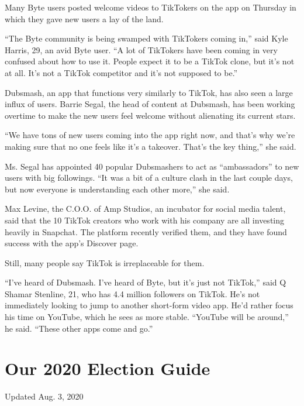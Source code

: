 Many Byte users posted welcome videos to TikTokers on the app on
Thursday in which they gave new users a lay of the land.

``The Byte community is being swamped with TikTokers coming in,'' said
Kyle Harris, 29, an avid Byte user. ``A lot of TikTokers have been
coming in very confused about how to use it. People expect it to be a
TikTok clone, but it's not at all. It's not a TikTok competitor and it's
not supposed to be.''

Dubsmash, an app that functions very similarly to TikTok, has also seen
a large influx of users. Barrie Segal, the head of content at Dubsmash,
has been working overtime to make the new users feel welcome without
alienating its current stars.

``We have tons of new users coming into the app right now, and that's
why we're making sure that no one feels like it's a takeover. That's the
key thing,'' she said.

Ms. Segal has appointed 40 popular Dubsmashers to act as ``ambassadors''
to new users with big followings. ``It was a bit of a culture clash in
the last couple days, but now everyone is understanding each other
more,'' she said.

Max Levine, the C.O.O. of Amp Studios, an incubator for social media
talent, said that the 10 TikTok creators who work with his company are
all investing heavily in Snapchat. The platform recently verified them,
and they have found success with the app's Discover page.

Still, many people say TikTok is irreplaceable for them.

``I've heard of Dubsmash. I've heard of Byte, but it's just not
TikTok,'' said Q Shamar Stenline, 21, who has 4.4 million followers on
TikTok. He's not immediately looking to jump to another short-form video
app. He'd rather focus his time on YouTube, which he sees as more
stable. ``YouTube will be around,'' he said. ``These other apps come and
go.''

\hypertarget{our-2020-election-guide}{%
\section{Our 2020 Election Guide}\label{our-2020-election-guide}}

Updated Aug. 3, 2020

